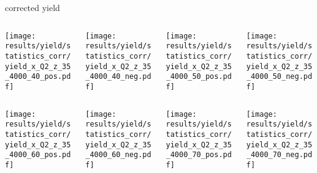 \begin{frame}{corrected yield}
\begin{columns}
\begin{column}[T]{0.25\textwidth}
\texttt{[image: results/yield/statistics\_corr/yield\_x\_Q2\_z\_35\_4000\_40\_pos.pdf]}
\end{column}
\begin{column}[T]{0.25\textwidth}
\texttt{[image: results/yield/statistics\_corr/yield\_x\_Q2\_z\_35\_4000\_40\_neg.pdf]}
\end{column}
\begin{column}[T]{0.25\textwidth}
\texttt{[image: results/yield/statistics\_corr/yield\_x\_Q2\_z\_35\_4000\_50\_pos.pdf]}
\end{column}
\begin{column}[T]{0.25\textwidth}
\texttt{[image: results/yield/statistics\_corr/yield\_x\_Q2\_z\_35\_4000\_50\_neg.pdf]}
\end{column}
\end{columns}
\begin{columns}
\begin{column}[T]{0.25\textwidth}
\texttt{[image: results/yield/statistics\_corr/yield\_x\_Q2\_z\_35\_4000\_60\_pos.pdf]}
\end{column}
\begin{column}[T]{0.25\textwidth}
\texttt{[image: results/yield/statistics\_corr/yield\_x\_Q2\_z\_35\_4000\_60\_neg.pdf]}
\end{column}
\begin{column}[T]{0.25\textwidth}
\texttt{[image: results/yield/statistics\_corr/yield\_x\_Q2\_z\_35\_4000\_70\_pos.pdf]}
\end{column}
\begin{column}[T]{0.25\textwidth}
\texttt{[image: results/yield/statistics\_corr/yield\_x\_Q2\_z\_35\_4000\_70\_neg.pdf]}
\end{column}
\end{columns}
\end{frame}
